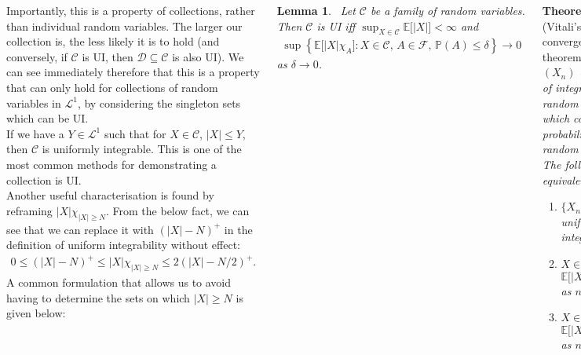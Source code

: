 \documentclass{tikzposter} %
\newtheorem{theorem}{Theorem}
\newtheorem{lemma}[theorem]{Lemma}
\begin{document}
\begin{columns}
{    Importantly, this is a property of collections, rather than individual random variables. The larger our collection is, the less likely it is to hold (and conversely, if $\mathcal{C}$ is UI, then $\mathcal{D} \subseteq \mathcal{C}$ is also UI). We can see immediately therefore that this is a property that can only hold for collections of random variables in $\mathcal{L}^{1}$, by considering the singleton sets which can be UI. \\

    If we have a $Y \in \mathcal{L}^{1}$ such that for $X \in \mathcal{C}$, $|X| \le Y$, then $\mathcal{C}$ is uniformly integrable. This is one of the most common methods for demonstrating a collection is UI. \\

    Another useful characterisation is found by reframing $|X|\chi_{|X| \ge N}$. From the below fact, we can see that we can replace it with $(|X|-N)^{+}$ in the definition of uniform integrability without effect:
    \begin{align*}
      0 \le (|X|-N)^{+} \le |X|\chi_{|X| \ge N} \le 2(|X|-N/2)^{+}.
    \end{align*}
    A common formulation that allows us to avoid having to determine the sets on which $|X| \ge N$ is given below:
    \begin{lemma}
      \ Let $\mathcal{C}$ be a family of random variables. Then $\mathcal{C}$ is UI iff $\displaystyle \sup_{X \in \mathcal{C}} \mathbb{E}\big[|X|\big] < \infty$ and
      \begin{align*}
        \sup \left\{\mathbb{E}\big[|X|\chi_{A}\big] : X \in \mathcal{C},\,A \in \mathcal{F},\, \mathbb{P}(A) \le \delta\right\} \to 0
      \end{align*}
      as $\delta \to 0$.
    \end{lemma}
    \hphantom{}

    \begin{theorem}[Vitali's convergence theorem]
    \ Take $(X_{n})$ a sequence of integrable random variables which converge in probability to a random variable $X$. The following are equivalent:
    \begin{enumerate}[label=\roman*.]
            \item $\{X_{n} : n \ge 1\}$ is uniformly integrable.
            \item $X \in \mathcal{L}^{1}$ and $\mathbb{E}\big[|X_{n}-X|\big] \to 0$ as $n \to \infty$.
            \item $X \in \mathcal{L}^{1}$ and $\mathbb{E}\big[|X_{n}|\big] \to \mathbb{E}\big[|X|\big]$ as $n \to \infty$.
    \end{enumerate}
    \end{theorem}
    \hphantom{}

}
\end{columns}
\end{document}
